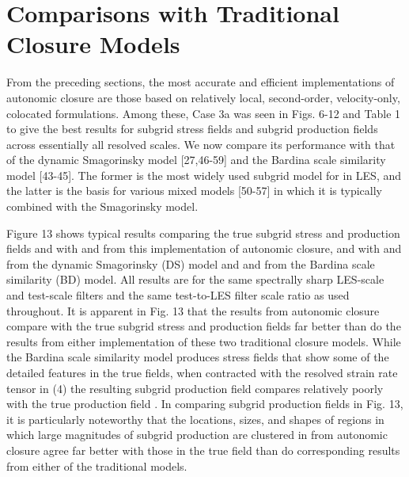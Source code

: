 \graphicspath{ {./Ch6/}  } 

\chapter{Comparisons with Traditional Closure Models}

From the preceding sections, the most accurate and efficient implementations of autonomic closure are those based on relatively local, second-order, velocity-only, colocated formulations. Among these, Case 3a was seen in Figs. 6-12 and Table 1 to give the best results for subgrid stress fields   and subgrid production fields   across essentially all resolved scales. We now compare its performance with that of the dynamic Smagorinsky model [27,46-59] and the Bardina scale similarity model [43-45]. The former is the most widely used subgrid model for   in LES, and the latter is the basis for various mixed models [50-57] in which it is typically combined with the Smagorinsky model. 

Figure 13 shows typical results comparing the true subgrid stress and production fields   and   with   and   from this implementation of autonomic closure, and with   and   from the dynamic Smagorinsky (DS) model and   and   from the Bardina scale similarity (BD) model. All results are for the same spectrally sharp LES-scale and test-scale filters and the same test-to-LES filter scale ratio   as used throughout. It is apparent in Fig. 13 that the results from autonomic closure compare with the true subgrid stress and production fields far better than do the results from either implementation of these two traditional closure models. While the Bardina scale similarity model produces stress fields   that show some of the detailed features in the true   fields, when contracted with the resolved strain rate tensor in (4) the resulting subgrid production field   compares relatively poorly with the true production field  . In comparing subgrid production fields in Fig. 13, it is particularly noteworthy that the locations, sizes, and shapes of regions in which large magnitudes of subgrid production are clustered in   from autonomic closure agree far better with those in the true   field than do corresponding results from either of the traditional models. 

